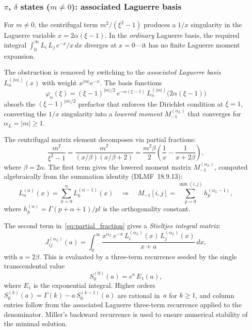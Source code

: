 \documentclass[aps,pra,twocolumn,superscriptaddress,longbibliography]{revtex4-2}
\begin{document}
\subsubsection{\texorpdfstring{$\pi$, $\delta$}{Pi, delta} states (\texorpdfstring{$m \neq 0$}{m != 0}): associated Laguerre basis}
\label{sec:algebraic_associated}

For $m \neq 0$, the centrifugal term $m^2/(\xi^2 - 1)$ produces
a $1/x$ singularity in the Laguerre variable $x = 2\alpha(\xi - 1)$.
In the \emph{ordinary} Laguerre basis, the required integral
$\int_0^\infty L_i\,L_j\,e^{-x}/x\,dx$ diverges at $x = 0$---it
has no finite Laguerre moment expansion.

The obstruction is removed by switching to the \emph{associated
Laguerre basis} $L_n^{(\lvert m\rvert)}(x)$ with weight
$x^{\lvert m\rvert} e^{-x}$.  The basis functions
\begin{equation}
  \varphi_n(\xi) = (\xi - 1)^{\lvert m\rvert/2}\,
    e^{-\alpha(\xi-1)}\,L_n^{(\lvert m\rvert)}\bigl(2\alpha(\xi-1)\bigr)
  \label{eq:associated_basis}
\end{equation}
absorb the $(\xi-1)^{\lvert m\rvert/2}$ prefactor that enforces the
Dirichlet condition at $\xi = 1$, converting the $1/x$ singularity
into a \emph{lowered moment} $M_{-1}^{(\alpha_L)}$ that converges for
$\alpha_L = \lvert m\rvert \geq 1$.

The centrifugal matrix element decomposes via partial fractions:
\begin{equation}
  \frac{m^2}{\xi^2 - 1} = \frac{m^2}{(x/\beta)(x/\beta + 2)}
  = \frac{m^2\beta}{2}\left(\frac{1}{x} - \frac{1}{x + 2\beta}\right),
  \label{eq:partial_fraction}
\end{equation}
where $\beta = 2\alpha$.  The first term gives the lowered moment
matrix $M_{-1}^{(\alpha_L)}$, computed algebraically from the
summation identity (DLMF~18.9.13):
\begin{equation}
  L_n^{(\alpha)}(x) = \sum_{k=0}^{n} L_k^{(\alpha-1)}(x)
  \quad\Longrightarrow\quad
  M_{-1}[i,j] = \sum_{p=0}^{\min(i,j)} h_p^{(\alpha_L - 1)},
  \label{eq:lowered_moment}
\end{equation}
where $h_p^{(\alpha)} = \Gamma(p + \alpha + 1)/p!$ is the
orthogonality constant.

The second term in~\eqref{eq:partial_fraction} gives a
\emph{Stieltjes integral matrix}:
\begin{equation}
  J^{(\alpha_L)}_{ij}(a) = \int_0^\infty
    \frac{x^{\alpha_L}\,e^{-x}\,L_i^{(\alpha_L)}(x)\,L_j^{(\alpha_L)}(x)}
    {x + a}\,dx,
  \label{eq:stieltjes}
\end{equation}
with $a = 2\beta$.  This is evaluated by a three-term recurrence
seeded by the single transcendental value
\begin{equation}
  S_0^{(0)}(a) = e^a\,E_1(a),
  \label{eq:stieltjes_seed}
\end{equation}
where $E_1$ is the exponential integral.  Higher orders
$S_0^{(k)}(a) = \Gamma(k) - a\,S_0^{(k-1)}(a)$ are rational in~$a$
for $k \geq 1$, and column entries follow from the associated
Laguerre three-term recurrence applied to the denominator.
Miller's backward recurrence is used to ensure numerical stability
of the minimal solution.
\end{document}
